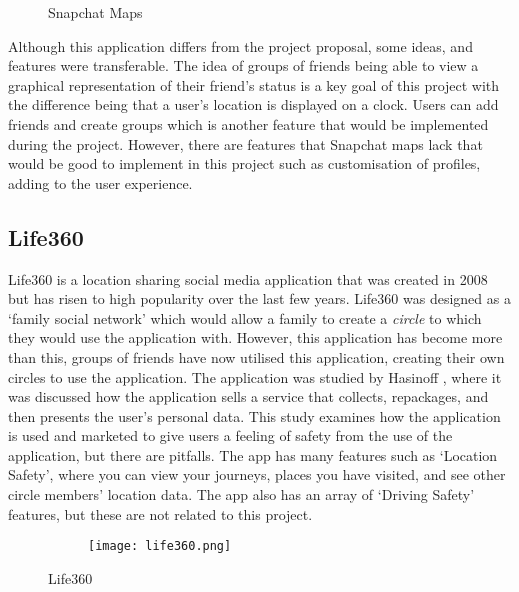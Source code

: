 \begin{figure}[!htbp]
    \centering
    \begin{subfigure}[b]{0.6\textwidth}
    \end{subfigure}
    \caption[Snapchat Maps]{Snapchat Maps \cite{snapMapImg}}
    \label{fig:snapMap}
\end{figure}
\FloatBarrier

Although this application differs from the project proposal, some ideas, and features were transferable. The idea of groups of friends being able to view a graphical representation of their friend's status is a key goal of this project with the difference being that a user's location is displayed on a clock. Users can add friends and create groups which is another feature that would be implemented during the project. However, there are features that Snapchat maps lack that would be good to implement in this project such as customisation of profiles, adding to the user experience.

\subsection{Life360}

Life360 is a location sharing social media application that was created in 2008 but has risen to high popularity over the last few years. Life360 was designed as a `family social network' which would allow a family to create a \textit{circle} to which they would use the application with. However, this application has become more than this, groups of friends have now utilised this application, creating their own circles to use the application. The application was studied by Hasinoff \cite{life360}, where it was discussed how the application sells a service that collects, repackages, and then presents the user's personal data. This study examines how the application is used and marketed to give users a feeling of safety from the use of the application, but there are pitfalls. The app has many features such as `Location Safety', where you can view your journeys, places you have visited, and see other circle members' location data. The app also has an array of `Driving Safety' features, but these are not related to this project. 

\begin{figure}[!htbp]
    \centering
    \begin{subfigure}[b]{0.21\textwidth}
        {\texttt{[image: life360.png]}}
    \end{subfigure}
    \caption[Life360]{Life360 \cite{lifeLoc}}
    \label{fig:life360}
\end{figure}
\FloatBarrier

